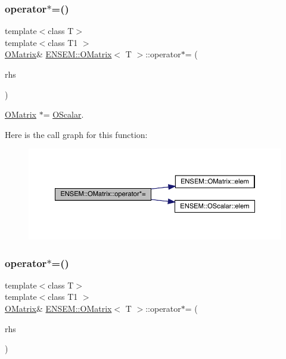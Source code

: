\subsubsection{\texorpdfstring{operator$\ast$=()}{operator*=()}\hspace{0.1cm}{\footnotesize\ttfamily [1/3]}}
{\footnotesize\ttfamily template$<$class T$>$ \\
template$<$class T1 $>$ \\
\mbox{\hyperlink{classENSEM_1_1OMatrix}{O\+Matrix}}\& \mbox{\hyperlink{classENSEM_1_1OMatrix}{E\+N\+S\+E\+M\+::\+O\+Matrix}}$<$ T $>$\+::operator$\ast$= (\begin{DoxyParamCaption}\item[{const \mbox{\hyperlink{classENSEM_1_1OScalar}{O\+Scalar}}$<$ T1 $>$ \&}]{rhs }\end{DoxyParamCaption})\hspace{0.3cm}{\ttfamily [inline]}}



\mbox{\hyperlink{classENSEM_1_1OMatrix}{O\+Matrix}} $\ast$= \mbox{\hyperlink{classENSEM_1_1OScalar}{O\+Scalar}}. 

Here is the call graph for this function\+:
\nopagebreak
\begin{figure}[H]
\begin{center}
\leavevmode
\includegraphics[width=350pt]{dd/d80/classENSEM_1_1OMatrix_a40e18b83c9eb609f7529e65c515010c2_cgraph}
\end{center}
\end{figure}
\mbox{\label{classENSEM_1_1OMatrix_a40e18b83c9eb609f7529e65c515010c2}} 
\subsubsection{\texorpdfstring{operator$\ast$=()}{operator*=()}\hspace{0.1cm}{\footnotesize\ttfamily [2/3]}}
{\footnotesize\ttfamily template$<$class T$>$ \\
template$<$class T1 $>$ \\
\mbox{\hyperlink{classENSEM_1_1OMatrix}{O\+Matrix}}\& \mbox{\hyperlink{classENSEM_1_1OMatrix}{E\+N\+S\+E\+M\+::\+O\+Matrix}}$<$ T $>$\+::operator$\ast$= (\begin{DoxyParamCaption}\item[{const \mbox{\hyperlink{classENSEM_1_1OScalar}{O\+Scalar}}$<$ T1 $>$ \&}]{rhs }\end{DoxyParamCaption})\hspace{0.3cm}{\ttfamily [inline]}}



